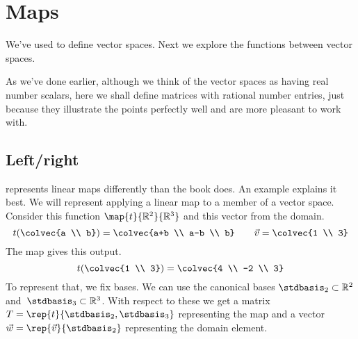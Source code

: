 \chapter{Maps}\label{chapter:maps}


We've used \Sage{} to define vector spaces.
Next we explore the functions between vector spaces.

As we've done earlier, although we think of the vector spaces 
as having real number scalars, here
we shall define matrices with rational number
entries, just because they illustrate the points perfectly well
and are more pleasant to work with.
  

\section{Left/right} \label{sec:leftright}
\Sage{} represents linear
maps differently than the book does.
An example explains it best.
We will represent applying a linear map 
to a member of a vector space.
Consider
this function $\map{t}{\Re^2}{\Re^3}$ and this vector from the domain.
\begin{equation*}
  t(\colvec{a \\ b})
  =\colvec{a+b \\ a-b \\ b}
  \qquad
  \vec{v}=\colvec{1 \\ 3}
\end{equation*}
The map gives this output.
\begin{equation*}
  t(\colvec{1 \\ 3})
  =\colvec{4 \\ -2 \\ 3}
\end{equation*}
To represent that, we fix bases. 
We can use the canonical bases $\stdbasis_2\subset\Re^2$ 
and~$\stdbasis_3\subset\Re^3$.
With respect to these we get  
a matrix~$T=\rep{t}{\stdbasis_2,\stdbasis_3}$ representing the map 
and a vector $\vec{w}=\rep{\vec{v}}{\stdbasis_2}$ representing
the domain element.

